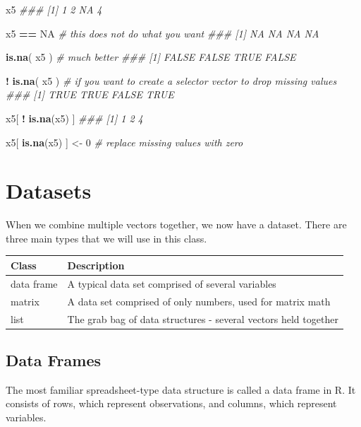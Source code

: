 \documentclass[]{book}
\newenvironment{Shaded}{\begin{snugshade}}{\end{snugshade}}
\newcommand{\CommentTok}[1]{\textcolor[rgb]{0.56,0.35,0.01}{\textit{#1}}}
\newcommand{\DecValTok}[1]{\textcolor[rgb]{0.00,0.00,0.81}{#1}}
\newcommand{\KeywordTok}[1]{\textcolor[rgb]{0.13,0.29,0.53}{\textbf{#1}}}
\newcommand{\NormalTok}[1]{#1}
\newcommand{\OperatorTok}[1]{\textcolor[rgb]{0.81,0.36,0.00}{\textbf{#1}}}
\newcommand{\OtherTok}[1]{\textcolor[rgb]{0.56,0.35,0.01}{#1}}
\newcommand{\StringTok}[1]{\textcolor[rgb]{0.31,0.60,0.02}{#1}}
\theoremstyle{definition}
\theoremstyle{definition}
\theoremstyle{definition}
\theoremstyle{remark}
\begin{document}
\begin{Shaded}
\begin{Highlighting}[]

\NormalTok{x5}
\CommentTok{### [1]  1  2 NA  4}

\NormalTok{x5 }\OperatorTok{==}\StringTok{ }\OtherTok{NA}    \CommentTok{# this does not do what you want}
\CommentTok{### [1] NA NA NA NA}

\KeywordTok{is.na}\NormalTok{( x5 )    }\CommentTok{# much better}
\CommentTok{### [1] FALSE FALSE  TRUE FALSE}

\OperatorTok{!}\StringTok{ }\KeywordTok{is.na}\NormalTok{( x5 )  }\CommentTok{# if you want to create a selector vector to drop missing values }
\CommentTok{### [1]  TRUE  TRUE FALSE  TRUE}

\NormalTok{x5[ }\OperatorTok{!}\StringTok{ }\KeywordTok{is.na}\NormalTok{(x5) ]}
\CommentTok{### [1] 1 2 4}

\NormalTok{x5[ }\KeywordTok{is.na}\NormalTok{(x5) ] <-}\StringTok{ }\DecValTok{0}  \CommentTok{# replace missing values with zero}
\end{Highlighting}
\end{Shaded}

\hypertarget{datasets}{%
\section{Datasets}\label{datasets}}

When we combine multiple vectors together, we now have a dataset. There
are three main types that we will use in this class.

\begin{longtable}[]{@{}ll@{}}
\toprule
Class & Description\tabularnewline
\midrule
\endhead
data frame & A typical data set comprised of several
variables\tabularnewline
matrix & A data set comprised of only numbers, used for matrix
math\tabularnewline
list & The grab bag of data structures - several vectors held
together\tabularnewline
\bottomrule
\end{longtable}

\hypertarget{data-frames}{%
\subsection{Data Frames}\label{data-frames}}

The most familiar spreadsheet-type data structure is called a data frame
in R. It consists of rows, which represent observations, and columns,
which represent variables.
\end{document}
